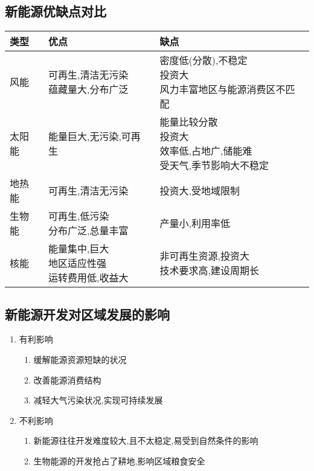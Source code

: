 \documentclass[a4paper]{article}
\begin{document}
    \subsection{新能源优缺点对比}
    \begin{table}[h]
        \begin{tabular}{|l|l|l}
            \hline
            类型 & 优点 & 缺点 \\
            \hline
            风能 & \makecell[l]{可再生,清洁无污染 \\ 蕴藏量大,分布广泛} & \makecell[l]{密度低(分散),不稳定 \\ 投资大 \\ 风力丰富地区与能源消费区不匹配} \\
            \hline
            太阳能 & 能量巨大,无污染,可再生 & \makecell[l]{能量比较分散 \\ 投资大 \\ 效率低,占地广,储能难 \\ 受天气,季节影响大不稳定} \\
            \hline
            地热能 & 可再生,清洁无污染 & 投资大,受地域限制 \\
            \hline
            生物能 & \makecell[l]{可再生,低污染 \\ 分布广泛,总量丰富} & 产量小,利用率低 \\
            \hline
            核能 & \makecell[l]{能量集中,巨大 \\ 地区适应性强 \\ 运转费用低,收益大} & \makecell[l]{非可再生资源,投资大 \\ 技术要求高,建设周期长} \\
            \hline
        \end{tabular}
    \end{table}
    \subsection{新能源开发对区域发展的影响}
    \begin{enumerate}
        \item 有利影响
        \begin{enumerate}
            \item 缓解能源资源短缺的状况
            \item 改善能源消费结构
            \item 减轻大气污染状况,实现可持续发展
        \end{enumerate}
        \item 不利影响
        \begin{enumerate}
            \item 新能源往往开发难度较大,且不太稳定,易受到自然条件的影响
            \item 生物能源的开发抢占了耕地,影响区域粮食安全
        \end{enumerate}
    \end{enumerate}
\end{document}
